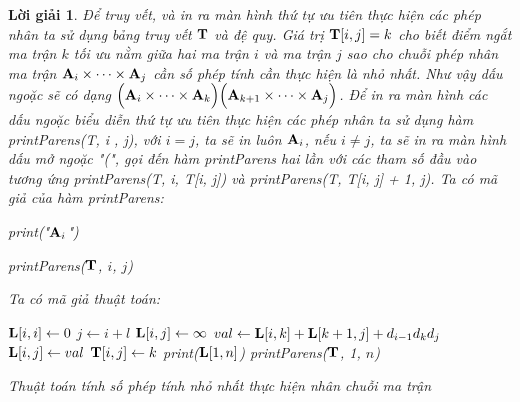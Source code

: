 \documentclass[14pt, a4paper]{article}
\theoremstyle{sltheorem}
\theoremstyle{soltheorem}
\newtheorem*{loigiai}{Lời giải}
\begin{document}
\begin{loigiai}
    Để truy vết, và in ra màn hình thứ tự ưu tiên thực hiện các phép nhân ta sử dụng bảng truy vết $\bold{T}$ và đệ quy.
    Giá trị $\bold{T} \lbrack i, j \rbrack=k$ cho biết điểm ngắt ma trận $k$ tối ưu nằm giữa hai ma trận $i$ và ma trận $j$ sao cho chuỗi phép nhân ma trận $\bold{A}_i \times \dots \times \bold{A}_j$ cần số phép tính cần thực hiện là nhỏ nhất.
    Như vậy dấu ngoặc sẽ có dạng $\Big ( \bold{A}_i \times \dots \times \bold{A}_k \Big) \Big( \bold{A}_{k + 1} \times \dots \times \bold{A}_j \Big)$.
    Để in ra màn hình các dấu ngoặc biểu diễn thứ tự ưu tiên thực hiện các phép nhân ta sử dụng hàm printParens(T, i , j), với $i = j$, ta sẽ in luôn $\bold{A}_i$, nếu $i \neq j$, ta sẽ in ra màn hình dấu mở ngoặc "(", gọi đến hàm printParens hai lần với các tham số đầu vào tương ứng printParens(T, i, T[i, j])
    và printParens(T, T[i, j] + 1, j). Ta có mã giả của hàm printParens:

    \begin{algorithm}
        \DontPrintSemicolon

         {
            print("$\bold{A}_i$")\;
        } 
        \caption{printParens($\bold{T}$, $i$, $j$)}
    \end{algorithm}

    Ta có mã giả thuật toán:

    \begin{algorithm}
        \DontPrintSemicolon

         {
            $\bold{L} \lbrack i, i \rbrack \gets 0$\;
        }
         {
             {
                $j \gets i + l$\;
                $\bold{L} \lbrack i, j \rbrack \gets \infty$\;
                 {
                    $val \gets \bold{L} \lbrack i, k \rbrack + \bold{L} \lbrack k + 1, j \rbrack + d_{i-1} d_{k} d_{j}$\;
                     {
                        $\bold{L} \lbrack i, j \rbrack \gets val$\;
                        $\bold{T} \lbrack i, j \rbrack \gets k$
                    }
                }
            }
        }
        print($\bold{L} \lbrack 1, n \rbrack$)\;
        printParens($\bold{T}$, 1, $n$)\;
        \caption{Thuật toán tính số phép tính nhỏ nhất thực hiện nhân chuỗi ma trận}
    \end{algorithm}


\end{loigiai}
\end{document}
